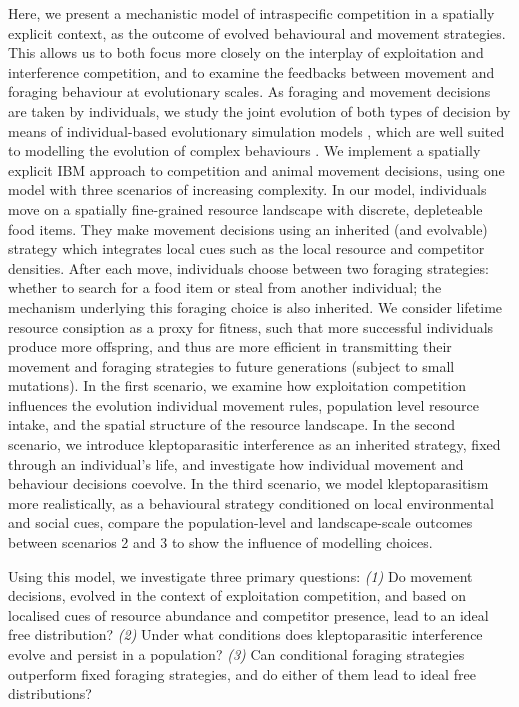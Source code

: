 \documentclass[11pt]{article}
\begin{document}
Here, we present a mechanistic model of intraspecific competition in a spatially explicit context, as the outcome of evolved behavioural and movement strategies.
This allows us to both focus more closely on the interplay of exploitation and interference competition, and to examine the feedbacks between movement and foraging behaviour at evolutionary scales. 
As foraging and movement decisions are taken by individuals, we study the joint evolution of both types of decision by means of individual-based evolutionary simulation models \citep[IBMs;][]{huston1988,deangelis2019}, which are well suited to modelling the evolution of complex behaviours \citep{netz2020,guttal2010,getz2016,getz2015}.
We implement a spatially explicit IBM approach to competition and animal movement decisions, using one model with three scenarios of increasing complexity.
In our model, individuals move on a spatially fine-grained resource landscape with discrete, depleteable food items.
They make movement decisions using an inherited (and evolvable) strategy which integrates local cues such as the local resource and competitor densities.
After each move, individuals choose between two foraging strategies: whether to search for a food item or steal from another individual; the mechanism underlying this foraging choice is also inherited.
We consider lifetime resource consiption as a proxy for fitness, such that more successful individuals produce more offspring, and thus are more efficient in transmitting their movement and foraging strategies to future generations (subject to small mutations).
In the first scenario, we examine how exploitation competition influences the evolution individual movement rules, population level resource intake, and the spatial structure of the resource landscape.
In the second scenario, we introduce kleptoparasitic interference as an inherited strategy, fixed through an individual's life, and investigate how individual movement and behaviour decisions coevolve.
In the third scenario, we model kleptoparasitism more realistically, as a behavioural strategy conditioned on local environmental and social cues, compare the population-level and landscape-scale outcomes between scenarios 2 and 3 to show the influence of modelling choices.

Using this model, we investigate three primary questions:
\textit{(1)} Do movement decisions, evolved in the context of exploitation competition, and based on localised cues of resource abundance and competitor presence, lead to an ideal free distribution?
\textit{(2)} Under what conditions does kleptoparasitic interference evolve and persist in a population?
\textit{(3)} Can conditional foraging strategies outperform fixed foraging strategies, and do either of them lead to ideal free distributions?
\end{document}
